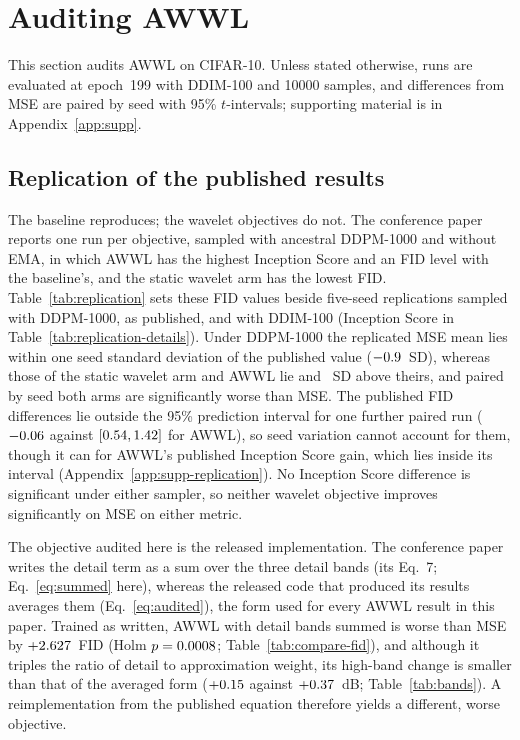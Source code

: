 \section{Auditing AWWL}
\label{sec:audit}
\label{sec:results}

This section audits AWWL on CIFAR-10. Unless stated otherwise, runs are
evaluated at epoch~199 with DDIM-100 and \num{10000} samples, and
differences from MSE are paired by seed with 95\% $t$-intervals; supporting
material is in Appendix~\ref{app:supp}.

\subsection{Replication of the published results}
\label{sec:replication}



The baseline reproduces; the wavelet objectives do not. The conference paper
\citep{thao2026awwl} reports one run per objective, sampled with ancestral
DDPM-1000 and without EMA, in which AWWL has the highest Inception Score and
an FID level with the baseline's, and the static wavelet arm has the lowest
FID. Table~\ref{tab:replication} sets these FID values beside five-seed
replications sampled with DDPM-1000, as published, and with DDIM-100
(Inception Score in Table~\ref{tab:replication-details}). Under DDPM-1000
the replicated MSE mean lies within one seed standard deviation of the
published value ($-0.9$~SD), whereas those of the static wavelet
arm and AWWL lie \pubOffsetSDStatic{} and \pubOffsetSDAWWL~SD above
theirs, and paired by seed both arms are significantly worse than MSE. The
published FID differences lie outside the 95\% prediction interval for one
further paired run ($-0.06$ against
$[0.54, 1.42]$ for AWWL), so seed variation cannot
account for them, though it can for AWWL's published Inception Score gain,
which lies inside its interval (Appendix~\ref{app:supp-replication}). No Inception Score difference is
significant under either sampler, so neither wavelet objective improves
significantly on MSE on either metric.

The objective audited here is the released implementation. The conference
paper writes the detail term as a sum over the three detail bands (its Eq.~7;
Eq.~\eqref{eq:summed} here), whereas the released code that produced its
results averages them (Eq.~\eqref{eq:audited}), the form used for every AWWL
result in this paper. Trained as written, AWWL with detail bands summed is
worse than MSE by $+2.627$~FID (Holm $p = 0.0008$;
Table~\ref{tab:compare-fid}), and although it triples the ratio of detail to
approximation weight, its high-band change is smaller than that of the
averaged form ($+0.15$ against $+0.37$~dB;
Table~\ref{tab:bands}). A reimplementation from the published equation
therefore yields a different, worse objective.

